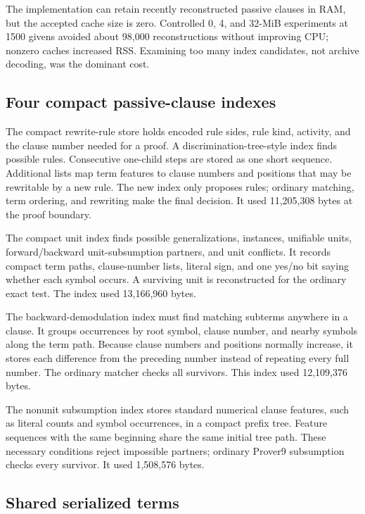 \documentclass[11pt]{article}
\begin{document}
The implementation can retain recently reconstructed passive clauses in RAM,
but the accepted cache size is zero.  Controlled 0, 4, and 32-MiB experiments
at 1500 givens avoided about 98,000 reconstructions without improving CPU;
nonzero caches increased RSS.  Examining too many index candidates, not archive
decoding, was the dominant cost.

\subsection{Four compact passive-clause indexes}

The compact rewrite-rule store holds encoded rule sides, rule kind, activity, and
the clause number needed for a proof.  A discrimination-tree-style index finds
possible rules.  Consecutive one-child steps are stored as one short sequence.
Additional lists map term features to clause numbers and positions that may be
rewritable by a new rule.  The new index only proposes rules; ordinary matching,
term ordering, and rewriting make the final decision.  It used 11,205,308 bytes
at the proof boundary.

The compact unit index finds possible generalizations, instances, unifiable
units, forward/backward unit-subsumption partners, and unit conflicts.  It
records compact term paths, clause-number lists, literal sign, and one yes/no
bit saying whether each symbol occurs.  A surviving unit is reconstructed for the ordinary exact
test.  The index used 13,166,960 bytes.

The backward-demodulation index must find matching subterms anywhere in a
clause.  It groups occurrences by root symbol, clause number, and nearby symbols
along the term path.  Because clause numbers and positions normally increase,
it stores each difference from the preceding number instead of repeating every
full number.  The ordinary matcher checks all survivors.  This index used
12,109,376 bytes.

The nonunit subsumption index stores standard numerical clause features, such
as literal counts and symbol occurrences, in a compact prefix tree.  Feature
sequences with the same beginning share the same initial tree path.  These
necessary conditions reject impossible partners; ordinary Prover9 subsumption
checks every survivor.  It used 1,508,576 bytes.

\subsection{Shared serialized terms}
\end{document}
